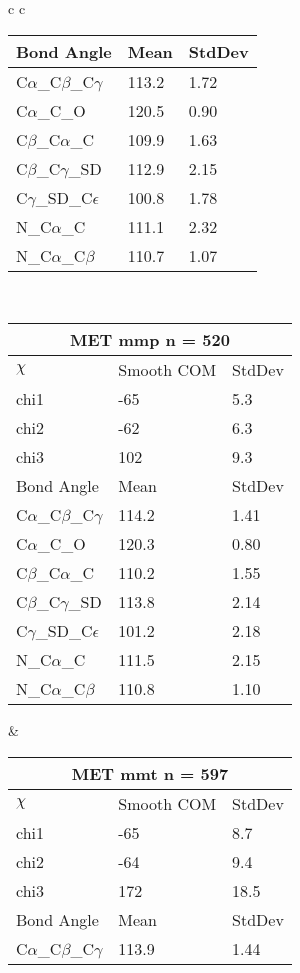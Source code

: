 \begin{longtable}{ c c }
\begin{tabular}{ l l l }
  Bond Angle   & Mean     & StdDev \\ \midrule
  C$\alpha$\_C$\beta$\_C$\gamma$ & 113.2 & 1.72\\
  C$\alpha$\_C\_O & 120.5 & 0.90\\
  C$\beta$\_C$\alpha$\_C & 109.9 & 1.63\\
  C$\beta$\_C$\gamma$\_SD & 112.9 & 2.15\\
  C$\gamma$\_SD\_C$\epsilon$ & 100.8 & 1.78\\
  N\_C$\alpha$\_C & 111.1 & 2.32\\
  N\_C$\alpha$\_C$\beta$ & 110.7 & 1.07\\
  \bottomrule
  \end{tabular}
  \\
  \begin{tabular}{ l l l }
  \toprule
  \multicolumn{3}{c}{MET \textbf{mmp} n = 520} \\ \toprule
  $\chi$       & Smooth COM & StdDev \\ \midrule
  chi1 & -65 & 5.3 \\ 
  chi2 & -62 & 6.3 \\ 
  chi3 & 102 & 9.3 \\ \midrule
  Bond Angle   & Mean     & StdDev \\ \midrule
  C$\alpha$\_C$\beta$\_C$\gamma$ & 114.2 & 1.41\\
  C$\alpha$\_C\_O & 120.3 & 0.80\\
  C$\beta$\_C$\alpha$\_C & 110.2 & 1.55\\
  C$\beta$\_C$\gamma$\_SD & 113.8 & 2.14\\
  C$\gamma$\_SD\_C$\epsilon$ & 101.2 & 2.18\\
  N\_C$\alpha$\_C & 111.5 & 2.15\\
  N\_C$\alpha$\_C$\beta$ & 110.8 & 1.10\\
  \bottomrule
  \end{tabular}
  &
  \begin{tabular}{ l l l }
  \toprule
  \multicolumn{3}{c}{MET \textbf{mmt} n = 597} \\ \toprule
  $\chi$       & Smooth COM & StdDev \\ \midrule
  chi1 & -65 & 8.7 \\ 
  chi2 & -64 & 9.4 \\ 
  chi3 & 172 & 18.5 \\ \midrule
  Bond Angle   & Mean     & StdDev \\ \midrule
  C$\alpha$\_C$\beta$\_C$\gamma$ & 113.9 & 1.44\\

\end{tabular}
\end{longtable}
